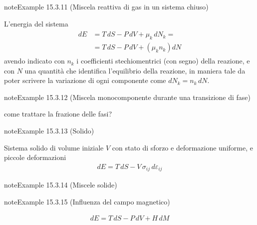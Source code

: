 \documentclass[letterpaper,10pt,italian]{jupyterBook}
\begin{document}
\begin{sphinxadmonition}{note}{Example 15.3.11 (Miscela reattiva di gas in un sistema chiuso)}



\sphinxAtStartPar
L’energia del sistema
\begin{equation*}
\begin{split}\begin{aligned}
  dE & = T \, dS - P \, dV + \mu_k \, dN_k = \\
     & = T \, dS - P \, dV + \left( \mu_k n_k \right) dN
\end{aligned}\end{split}
\end{equation*}
\sphinxAtStartPar
avendo indicato con \(n_k\) i coefficienti stechiomentrici (con segno) della reazione, e con \(N\) una quantità che identifica l’equilibrio della reazione, in maniera tale da poter scrivere la variazione di ogni componente come \(d N_k = n_k \, d N\).
\end{sphinxadmonition}
\label{ch/thermodynamics/principles-gibbs-phase-rule:example-15}
\begin{sphinxadmonition}{note}{Example 15.3.12 (Miscela monocomponente durante una transizione di fase)}



\sphinxAtStartPar
{} come trattare la frazione delle fasi?
\end{sphinxadmonition}
\label{ch/thermodynamics/principles-gibbs-phase-rule:example-16}
\begin{sphinxadmonition}{note}{Example 15.3.13 (Solido)}



\sphinxAtStartPar
Sistema solido di volume iniziale \(V\) con stato di sforzo e deformazione uniforme, e piccole deformazioni
\begin{equation*}
\begin{split}dE = T \, dS - V \, \sigma_{ij} \, d \varepsilon_{ij} \end{split}
\end{equation*}\end{sphinxadmonition}
\label{ch/thermodynamics/principles-gibbs-phase-rule:example-17}
\begin{sphinxadmonition}{note}{Example 15.3.14 (Miscele solide)}



\sphinxAtStartPar
{}
\end{sphinxadmonition}
\label{ch/thermodynamics/principles-gibbs-phase-rule:example-18}
\begin{sphinxadmonition}{note}{Example 15.3.15 (Influenza del campo magnetico)}


\begin{equation*}
\begin{split}dE = T \, dS - P \, d V + H \, dM\end{split}
\end{equation*}
\sphinxAtStartPar
{}
\end{sphinxadmonition}
\end{document}
